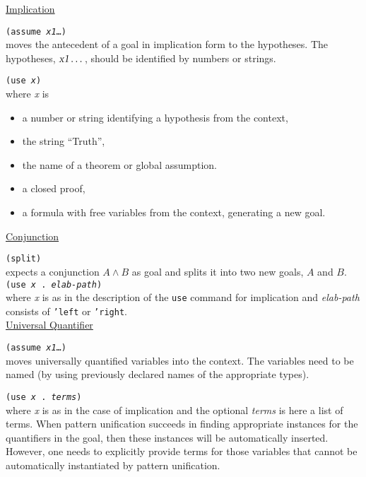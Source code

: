 \documentclass[12pt]{amsart}
\newcommand{\inquotes}[1]{``#1''}
\begin{document}
\underline{Implication}

\texttt{(assume \textsl{x1}\dots)}\\
moves the antecedent of a goal in implication form to
the hypotheses. The hypotheses,  $\textsl{x1}\dots$,
should be identified by numbers
or strings.

\texttt{(use \textsl{x})}\\
where \textsl{x} is
\begin{itemize}
\item a number or string identifying a hypothesis from the context,
\item the string \inquotes{Truth},
\item the name of a theorem or global assumption.
\item a closed proof,
\item a formula with free variables from the context, generating a new
goal.\\
\end{itemize}

\underline{Conjunction}

\texttt{(split)}\\
expects a conjunction $A \land B$ as goal and splits it into
two new goals, $A$ and $B$.\\

\texttt{(use \textsl{x} . \textsl{elab-path})}\\
where \textsl{x} is as in the description of the \texttt{use}
command for implication and \textsl{elab-path} consists of \texttt{'left}
or \texttt{'right}.\\

\underline{Universal Quantifier}

\texttt{(assume \textsl{x1}\dots)}\\
moves universally quantified variables into the context.  The variables
need to be named (by using previously declared names of
the appropriate types).

\texttt{(use \textsl{x} . \textsl{terms})}\\
where \textsl{x} is as in the case of implication and the optional
\textsl{terms} is here a list of terms.  When pattern unification
succeeds in finding appropriate instances for the quantifiers in the
goal, then these instances will be automatically inserted.  However,
one needs to explicitly provide terms for those variables that cannot
be automatically instantiated by pattern
unification.
\end{document}
